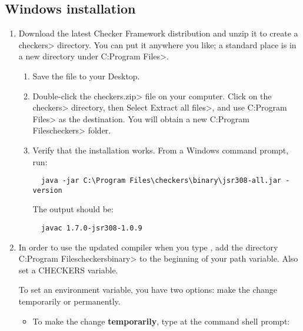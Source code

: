 \subsection{Windows installation\label{windows-installation}}

\begin{enumerate}

\item
  Download the latest Checker Framework distribution
  and unzip it to create a \<checkers> directory.  You can put it anywhere
  you like; a standard place is in a new directory under \<C:\ttbs{}Program
  Files>.

\begin{enumerate}
\item
  Save the file
  to your Desktop.
\item
  Double-click the \<checkers.zip> file on your computer.  Click on
  the \<checkers> directory, then Select \<Extract all files>, and use
  \<C:\ttbs{}Program Files> as the destination.  You will obtain a new
  \<C:\ttbs{}Program Files\ttbs{}checkers> folder.
\item
  Verify that the installation works.  From a Windows command prompt, run:

\begin{Verbatim}
  java -jar C:\Program Files\checkers\binary\jsr308-all.jar -version
\end{Verbatim}

The output should be:

\begin{Verbatim}
  javac 1.7.0-jsr308-1.0.9
\end{Verbatim}

\end{enumerate}


\item
  In order to use the updated compiler when you type , add the
  directory \<C:\ttbs{}Program Files\ttbs{}checkers\ttbs{}binary> to the
  beginning of your path variable.  Also set a CHECKERS variable.


To set an environment variable, you have two options:  make the change
temporarily or permanently.
\begin{itemize}
\item
To make the change \textbf{temporarily}, type at the command shell prompt:


\end{itemize}
\end{enumerate}
